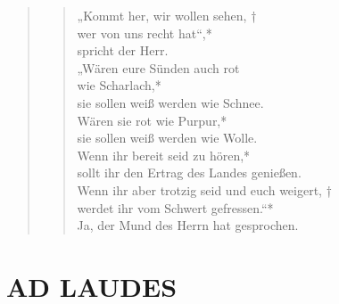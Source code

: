 \begin{quote}
\begin{verse}
„Kommt her, wir wollen sehen, † \\
wer von uns recht hat“,*\\
spricht der Herr.\\
\vin „Wären eure Sünden auch rot\\
\vin wie Scharlach,*\\
\vin sie sollen weiß werden wie Schnee.\\
Wären sie rot wie Purpur,*\\
sie sollen weiß werden wie Wolle.\\
\vin Wenn ihr bereit seid zu hören,*\\
\vin sollt ihr den Ertrag des Landes genießen.\\
Wenn ihr aber trotzig seid und euch weigert, †\\
werdet ihr vom Schwert gefressen.“*\\
Ja, der Mund des Herrn hat gesprochen.
 
\end{verse}
\end{quote}

\begin{flushleft}


\end{flushleft}


\section[LAUDES]{AD LAUDES}

\def\greinitialformat#1{{\fontsize{40}{40}\selectfont #1}}
\gresetfirstlineaboveinitial{\small \textcolor{red}{ Ps 118a}}{}
\setaboveinitialseparation{0.72mm}


\medskip


